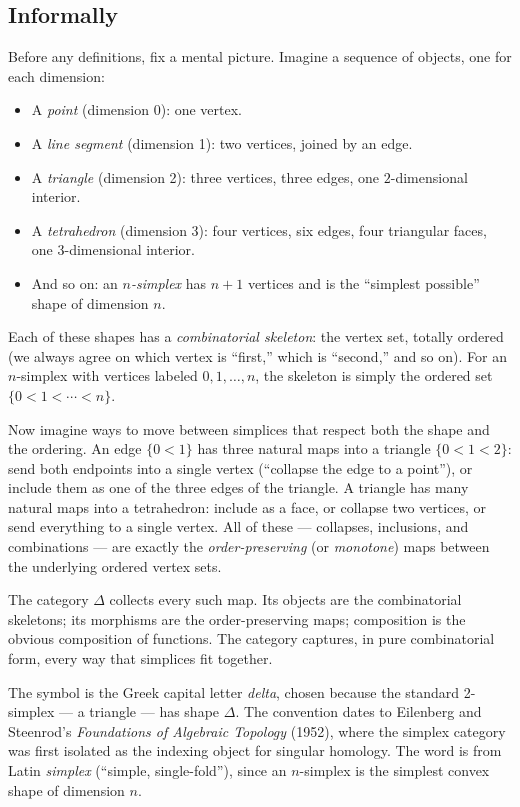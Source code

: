 \subsection{Informally}

Before any definitions, fix a mental picture. Imagine a sequence of
objects, one for each dimension:
\begin{itemize}
  \item A \emph{point} (dimension 0): one vertex.
  \item A \emph{line segment} (dimension 1): two vertices, joined by an edge.
  \item A \emph{triangle} (dimension 2): three vertices, three edges,
        one $2$-dimensional interior.
  \item A \emph{tetrahedron} (dimension 3): four vertices, six edges,
        four triangular faces, one $3$-dimensional interior.
  \item And so on: an \emph{$n$-simplex} has $n+1$ vertices and is the
        ``simplest possible'' shape of dimension $n$.
\end{itemize}

Each of these shapes has a \emph{combinatorial skeleton}: the vertex
set, totally ordered (we always agree on which vertex is ``first,''
which is ``second,'' and so on). For an $n$-simplex with vertices
labeled $0, 1, \ldots, n$, the skeleton is simply the ordered set
$\{0 < 1 < \cdots < n\}$.

Now imagine ways to move between simplices that respect both the shape
and the ordering. An edge $\{0 < 1\}$ has three natural maps into a
triangle $\{0 < 1 < 2\}$: send both endpoints into a single vertex
(``collapse the edge to a point''), or include them as one of the
three edges of the triangle. A triangle has many natural maps into a
tetrahedron: include as a face, or collapse two vertices, or send
everything to a single vertex. All of these — collapses, inclusions,
and combinations — are exactly the \emph{order-preserving} (or
\emph{monotone}) maps between the underlying ordered vertex sets.

The category $\Delta$ collects every such map. Its objects are the
combinatorial skeletons; its morphisms are the order-preserving maps;
composition is the obvious composition of functions. The category
captures, in pure combinatorial form, every way that simplices fit
together.

\begin{nameorigin}
The symbol \term{$\Delta$} is the Greek capital letter \emph{delta},
chosen because the standard 2-simplex — a triangle — has shape $\Delta$.
The convention dates to Eilenberg and Steenrod's \emph{Foundations of
Algebraic Topology} (1952), where the simplex category was first
isolated as the indexing object for singular homology. The word
 is from Latin \emph{simplex} (``simple, single-fold''),
since an $n$-simplex is the simplest convex shape of dimension $n$.
\end{nameorigin}

